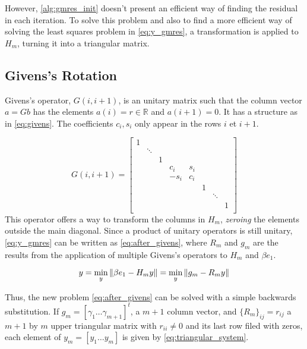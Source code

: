 However, \ref{alg:gmres_init} doesn't present an efficient way of finding the residual in each iteration. To solve this problem and also to find a more efficient way of solving the least squares problem in \ref{eq:y_gmres}, a transformation is applied to $H_{m}$, turning it into a triangular matrix.

\subsection{Givens's Rotation}

Givens's operator, $G(i,i+1)$, is an unitary matrix such that the column vector $a = Gb$ has the elements $a(i) = r \in \mathbb{R}$ and $a(i+1)=0$. It has a structure as in \ref{eq:givens}. The coefficients $c_{i},s_{i}$ only appear in the rows $i$ et $i+1$.

\begin{equation}\label{eq:givens}
    G(i,i+1)=
    \begin{bmatrix}
        1 &        &   &        &       &   &        &   \\
          & \ddots &   &        &       &   &        &   \\
          &        & 1 &        &       &   &        &   \\
          &        &   & c_{i}  & s_{i} &   &        &   \\
          &        &   & -s_{i} & c_{i} &   &        &   \\
          &        &   &        &       & 1 &        &   \\
          &        &   &        &       &   & \ddots &   \\
          &        &   &        &       &   &        & 1 \\
    \end{bmatrix}
\end{equation}
This operator offers a way to transform the columns in $H_{m}$, \textit{zeroing} the elements outside the main diagonal. Since a product of unitary operators is still unitary, \ref{eq:y_gmres} can be written as \ref{eq:after_givens}, where $R_{m}$ and $g_{m}$ are the results from the application of multiple Givens's operators to $H_{m}$ and $\beta e_{1}$.

\begin{equation}\label{eq:after_givens}
    y = \min_{y} \left\lVert\beta e_{1} - H_{m}y\right\rVert = \min_{y} \left\lVert g_{m} - R_{m}y\right\rVert
\end{equation}


Thus, the new problem \ref{eq:after_givens} can be solved with a simple backwards substitution. If $g_{m} = [\gamma_{1} \dots \gamma_{m+1}]^{t}$, a $m+1$ column vector, and $\{ R_{m} \}_{ij} = r_{ij}$ a $m+1$ by $m$ upper triangular matrix with $r_{ii} \neq 0$ and its last row filed with zeros, each element of $y_{m} = [y_{1} \dots y_{m}]$ is given by \ref{eq:triangular_system}.

